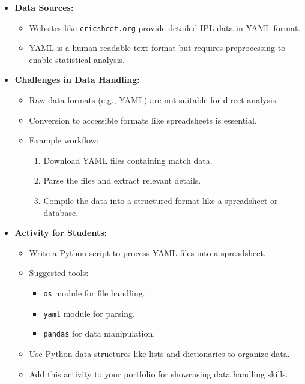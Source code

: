 \documentclass{article}
\begin{document}
\begin{itemize}
  \item \textbf{Data Sources:}
    \begin{itemize}
      \item Websites like \texttt{cricsheet.org} provide detailed IPL data in YAML format.
      \item YAML is a human-readable text format but requires preprocessing to enable statistical analysis.
    \end{itemize}

  \item \textbf{Challenges in Data Handling:}
    \begin{itemize}
      \item Raw data formats (e.g., YAML) are not suitable for direct analysis.
      \item Conversion to accessible formats like spreadsheets is essential.
      \item Example workflow:
        \begin{enumerate}
          \item Download YAML files containing match data.
          \item Parse the files and extract relevant details.
          \item Compile the data into a structured format like a spreadsheet or database.
        \end{enumerate}
    \end{itemize}

  \item \textbf{Activity for Students:}
    \begin{itemize}
      \item Write a Python script to process YAML files into a spreadsheet.
      \item Suggested tools:
        \begin{itemize}
          \item \texttt{os} module for file handling.
          \item \texttt{yaml} module for parsing.
          \item \texttt{pandas} for data manipulation.
        \end{itemize}
      \item Use Python data structures like lists and dictionaries to organize data.
      \item Add this activity to your portfolio for showcasing data handling skills.
    \end{itemize}
\end{itemize}
\end{document}
